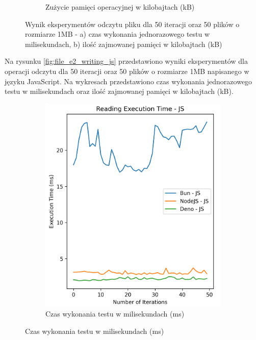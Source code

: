 \begin{figure}[H]
\begin{subfigure}[b]{0.42\textwidth}
    \caption{Zużycie pamięci operacyjnej w kilobajtach (kB)}
    \label{fig:file_e2_reading_js_memory}
  \end{subfigure}
  \caption{Wynik eksperymentów odczytu pliku dla 50 iteracji oraz 50 plików o rozmiarze 1MB - a) czas wykonania jednorazowego testu w milisekundach, b) ilość zajmowanej pamięci w kilobajtach (kB)}
  \label{fig:file_e2_reading_js}
\end{figure}

Na rysunku \ref{fig:file_e2_writing_js} przedstawiono wyniki eksperymentów dla operacji odczytu dla 50 iteracji oraz 50 plików o rozmiarze 1MB napisanego w języku JavaScript. Na wykresach przedstawiono czas wykonania jednorazowego testu w milisekundach oraz ilość zajmowanej pamięci w kilobajtach (kB).

\begin{figure}[H]
  \centering
  \begin{subfigure}[b]{0.42\textwidth}
    \centering
    \includegraphics[width=\textwidth]{Figures/files/files_writing_50_2000_50_js_time.png}
    \caption{Czas wykonania testu w milisekundach (ms)}
    \label{fig:file_e2_writing_js_time}
  \end{subfigure}

\end{figure}
